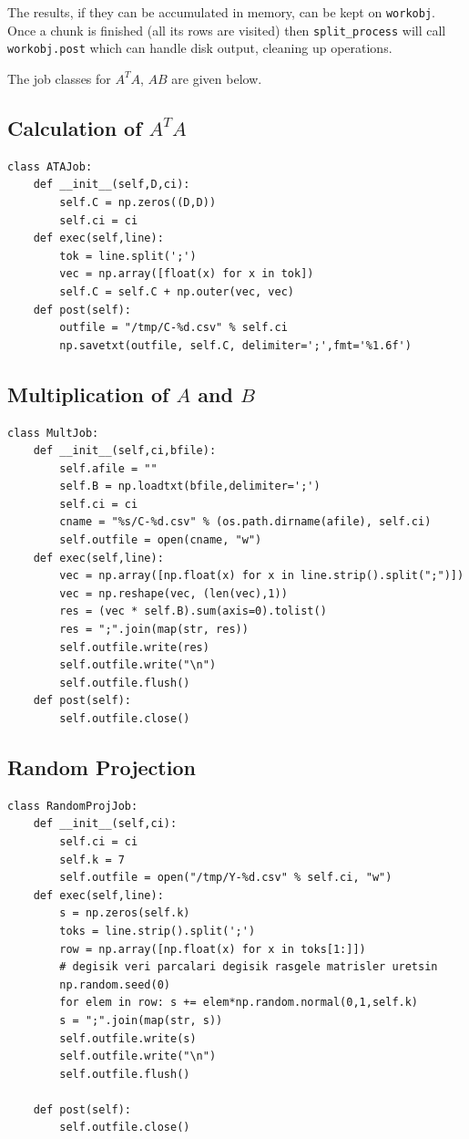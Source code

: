\documentclass{article}
\begin{document}
The results, if they can be accumulated in memory, can be kept on
\verb!workobj!. Once a chunk is finished (all its rows are visited) then
\verb!split_process! will call \verb!workobj.post! which can handle disk output,
cleaning up operations.

The job classes for $A^T A$, $AB$ are given below.

\subsection{Calculation of $A^T A$}

\begin{verbatim}
class ATAJob:
    def __init__(self,D,ci):
        self.C = np.zeros((D,D))
        self.ci = ci
    def exec(self,line):
        tok = line.split(';')
        vec = np.array([float(x) for x in tok])
        self.C = self.C + np.outer(vec, vec)
    def post(self):
        outfile = "/tmp/C-%d.csv" % self.ci
        np.savetxt(outfile, self.C, delimiter=';',fmt='%1.6f')
\end{verbatim}

\subsection{Multiplication of $A$ and $B$}

\begin{verbatim}
class MultJob:
    def __init__(self,ci,bfile):
        self.afile = ""
        self.B = np.loadtxt(bfile,delimiter=';')
        self.ci = ci
        cname = "%s/C-%d.csv" % (os.path.dirname(afile), self.ci)
        self.outfile = open(cname, "w")        
    def exec(self,line):        
        vec = np.array([np.float(x) for x in line.strip().split(";")])
        vec = np.reshape(vec, (len(vec),1))
        res = (vec * self.B).sum(axis=0).tolist()  
        res = ";".join(map(str, res))
        self.outfile.write(res)
        self.outfile.write("\n")
        self.outfile.flush()
    def post(self):
        self.outfile.close()
\end{verbatim}

\subsection{Random Projection}

\begin{verbatim}
class RandomProjJob:
    def __init__(self,ci):
        self.ci = ci
        self.k = 7
        self.outfile = open("/tmp/Y-%d.csv" % self.ci, "w")        
    def exec(self,line):
        s = np.zeros(self.k)
        toks = line.strip().split(';')
        row = np.array([np.float(x) for x in toks[1:]])
        # degisik veri parcalari degisik rasgele matrisler uretsin
        np.random.seed(0) 
        for elem in row: s += elem*np.random.normal(0,1,self.k) 
        s = ";".join(map(str, s))
        self.outfile.write(s)
        self.outfile.write("\n")
        self.outfile.flush()
        
    def post(self):
        self.outfile.close()
\end{verbatim}
\end{document}
